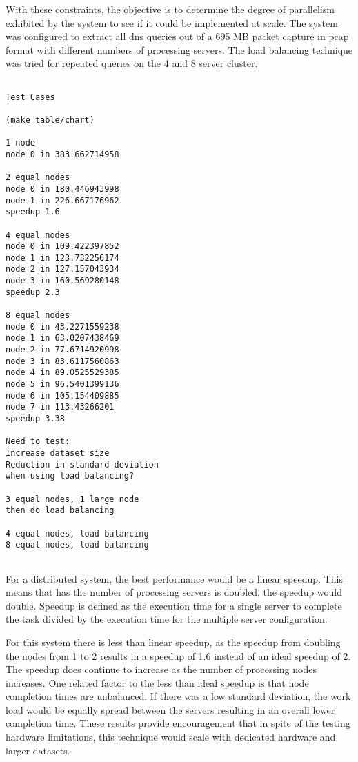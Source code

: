 \documentclass{article}
\begin{document}
\begin{multicols}{2}
With these constraints, the objective is to determine the degree of parallelism exhibited by the system to see if it could be implemented at scale. The system was configured to extract all dns queries out of a 695 MB packet capture in pcap format with different numbers of processing servers.  The load balancing technique was tried for repeated queries on the 4 and 8 server cluster. 

\begin{verbatim}

Test Cases

(make table/chart)

1 node
node 0 in 383.662714958

2 equal nodes
node 0 in 180.446943998
node 1 in 226.667176962
speedup 1.6

4 equal nodes
node 0 in 109.422397852
node 1 in 123.732256174
node 2 in 127.157043934
node 3 in 160.569280148
speedup 2.3

8 equal nodes
node 0 in 43.2271559238
node 1 in 63.0207438469
node 2 in 77.6714920998
node 3 in 83.6117560863
node 4 in 89.0525529385
node 5 in 96.5401399136
node 6 in 105.154409885
node 7 in 113.43266201
speedup 3.38

Need to test:
Increase dataset size
Reduction in standard deviation
when using load balancing?

3 equal nodes, 1 large node
then do load balancing

4 equal nodes, load balancing
8 equal nodes, load balancing


\end{verbatim}

For a distributed system, the best performance would be a linear speedup.  This means that has the number of processing servers is doubled, the speedup would double. Speedup is defined as the execution time for a single server to complete the task divided by the execution time for the multiple server configuration.

For this system there is less than linear speedup, as the speedup from doubling the nodes from 1 to 2 results in a speedup of 1.6 instead of an ideal speedup of 2.  The speedup does continue to increase as the number of processing nodes increases. One related factor to the less than ideal speedup is that node completion times are unbalanced. If there was a low standard deviation, the work load would be equally spread between the servers resulting in an overall lower completion time.  %
These results provide encouragement that in spite of the testing hardware limitations, this technique would scale with dedicated hardware and larger datasets.


\end{multicols}
\end{document}
